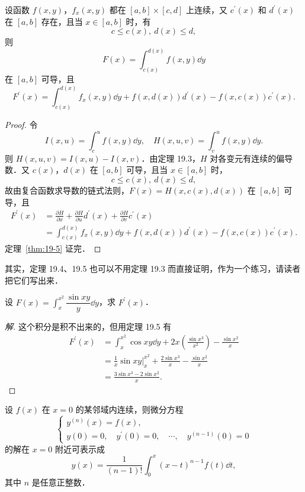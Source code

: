\begin{theorem}\label{thm:19-5}
设函数 $f(x,y)$，$f_{x}(x,y)$ 都在 $[a,b]\times[c,d]$ 上连续，又 $c^{\prime}(x)$ 和 $d^{\prime}(x)$ 在 $[a,b]$ 存在，且当 $x\in[a,b]$ 时，有
\[
c\leqslant c(x),\ d(x)\leqslant d,
\]
则
\[
F(x)=\int_{c(x)}^{d(x)}f(x,y)\dd y
\]
在 $[a,b]$ 可导，且
\[
F^{\prime}(x)=\int_{c(x)}^{d(x)}f_{x}(x,y)\dd y+f(x,d(x))d^{\prime}(x)-f(x,c(x))c^{\prime}(x).
\]
\end{theorem}

\begin{proof}
令
\[
I(x,u)=\int_{c}^{u}f(x,y)\dd y,\quad H(x,u,v)=\int_{v}^{u}f(x,y)\dd y.
\]
则 $H(x,u,v)=I(x,u)-I(x,v)$．由定理 19.3，$H$ 对各变元有连续的偏导数．又 $c(x)$，$d(x)$ 在 $[a,b]$ 可导，且当 $x\in[a,b]$ 时，
\[
c\leqslant c(x),\ d(x)\leqslant d,
\]
故由复合函数求导数的链式法则，$F(x)=H(x,c(x),d(x))$ 在 $[a,b]$ 可导，且
\[
\begin{aligned}
F^{\prime}(x)&=\frac{\partial H}{\partial x}+\frac{\partial H}{\partial u}d^{\prime}(x)+\frac{\partial H}{\partial v}c^{\prime}(x)\\
&=\int_{c(x)}^{d(x)}f_{x}(x,y)\dd y+f(x,d(x))d^{\prime}(x)-f(x,c(x))c^{\prime}(x).
\end{aligned}
\]
定理~\ref{thm:19-5} 证完．
\end{proof}

其实，定理 19.4、19.5 也可以不用定理 19.3 而直接证明，作为一个练习，请读者把它们写出来．

\begin{example}\label{ex:19-1-3}
设 $F(x)=\int_{x}^{x^{2}}\dfrac{\sin xy}{y}\dd y$，求 $F^{\prime}(x)$．
\end{example}

\begin{proof}[解]
这个积分是积不出来的，但用定理 19.5 有
\[
\begin{aligned}
F^{\prime}(x)&=\int_{x}^{x^{2}}\cos xy\dd y+2x\left(\frac{\sin x^{3}}{x^{2}}\right)-\frac{\sin x^{2}}{x}\\
&=\frac{1}{x}\sin xy\bigg|_{x}^{x^{2}}+\frac{2\sin x^{3}}{x}-\frac{\sin x^{2}}{x}\\
&=\frac{3\sin x^{3}-2\sin x^{2}}{x}.
\end{aligned}
\]
\end{proof}

\begin{example}\label{ex:19-1-4}
设 $f(x)$ 在 $x=0$ 的某邻域内连续，则微分方程
\[
\begin{cases}
y^{(n)}(x)=f(x),\\
y(0)=0,\quad y^{\prime}(0)=0,\quad\cdots,\quad y^{(n-1)}(0)=0
\end{cases}
\]
的解在 $x=0$ 附近可表示成
\[
y(x)=\frac{1}{(n-1)!}\int_{0}^{x}(x-t)^{n-1}f(t)\dd t,
\]
其中 $n$ 是任意正整数．
\end{example}

